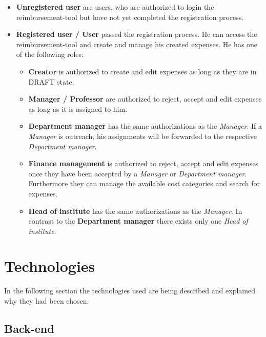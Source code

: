 \begin{itemize}
    \item \textbf{Unregistered user} are users, who are authorized to login the reimbursement-tool but have not yet completed the registration process.
    \item \textbf{Registered user / User} passed the registration process. He can access the reimbursement-tool and create and manage his created expenses. He has one of the following roles:
    
    \begin{itemize}
        \item \textbf{Creator} is authorized to create and edit expenses as long as they are in DRAFT state.
        
        \item \textbf{Manager / Professor} are authorized to reject, accept and edit expenses as long as it is assigned to him.
        
        \item \textbf{Department manager} has the same authorizations as the \textit{Manager}. If a \textit{Manager} is outreach, his assignments will be forwarded to the respective \textit{Department manager}.
        
        \item \textbf{Finance management} is authorized to reject, accept and edit expenses once they have been accepted by a \textit{Manager} or \textit{Department manager}. Furthermore they can manage the available cost categories and search for expenses.
        
        \item \textbf{Head of institute} has the same authorizations as the \textit{Manager}. In contrast to the \textbf{Department manager} there exists only one \textit{Head of institute}.
    \end{itemize}
\end{itemize}
    

\section{Technologies}

In the following section the technologies used are being described and explained why they had been chosen. 

\subsection{Back-end}

